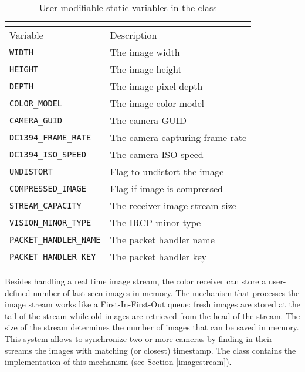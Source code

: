 \begin{table}[ht]
\caption{User-modifiable static variables in the \ColorReceiver{} class}
\begin{center}
\begin{tabular}{| l | l |}
	\multicolumn{2}{c}{\ColorReceiver{}} \\
	\hline
	Variable & Description \\
	\hline \hline
	\texttt{WIDTH} 						& The image width \\
	\texttt{HEIGHT} 					& The image height \\
	\texttt{DEPTH} 						& The image pixel depth \\
	\texttt{COLOR\_MODEL} 				& The image color model \\
	\texttt{CAMERA\_GUID} 				& The camera GUID \\
	\texttt{DC1394\_FRAME\_RATE} 		& The camera capturing frame rate \\
	\texttt{DC1394\_ISO\_SPEED} 			& The camera ISO speed \\
	\texttt{UNDISTORT} 				& Flag to undistort the image \\
	\texttt{COMPRESSED\_IMAGE} 		& Flag if image is compressed \\
	\texttt{STREAM\_CAPACITY} 			& The receiver image stream size \\
	\texttt{VISION\_MINOR\_TYPE} 		& The IRCP minor type \\
	\texttt{PACKET\_HANDLER\_NAME} 	& The packet handler name \\
	\texttt{PACKET\_HANDLER\_KEY} 				& The packet handler key \\
	\hline
\end{tabular}
\end{center}
\label{colorreceivervariables}
\end{table}

Besides handling a real time image stream, the color receiver can store a user-defined number of last seen 
images in memory. The mechanism that processes the image stream works like a First-In-First-Out queue: 
fresh images are stored at the tail of the stream while old images are retrieved from the head of the stream. 
The size of the stream determines the number of images that can be saved in memory. This system allows
to synchronize two or more cameras by finding in their streams the images with matching (or closest) 
timestamp. The \ImageStream{} class contains the implementation of this mechanism (see Section 
\ref{imagestream}).
